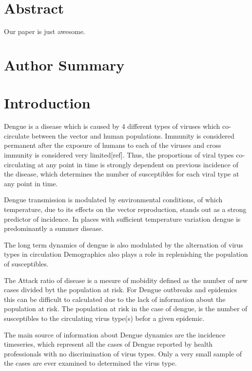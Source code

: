 \section*{Abstract}
Our paper is just awesome.
\section*{Author Summary}

\section*{Introduction}

Dengue is a disease which is caused by 4 different types of viruses 
which co-circulate between the vector and human populations. Immunity is 
considered permanent after the exposure of humans to each of the viruses and 
cross immunity is considered very limited[ref].
Thus, the proportions of viral types co-circulating at any point in time is 
strongly dependent on previous incidence of the disease, which determines the 
number of susceptibles for each viral type at any point in time.

Dengue transmission is modulated by environmental conditions, of which 
temperature, due to its effects on the 
vector reproduction, stands out as a strong predictor of 
incidence\cite{honorio_temporal_2009,wu_higher_2009}.
In places with sufficient temperature variation dengue is predominantly a 
summer disease.

The long term dynamics of dengue is also modulated by the alternation of virus 
types in circulation Demographics also plays a role in replenishing the 
population of susceptibles. 

The Attack ratio of disease is a mesure of mobidity defined as the number of new
cases divided byt the population at risk. For Dengue outbreaks and epidemics 
this can be difficult to calculated due to the lack of information about the 
population at risk. The population at risk in the case of dengue, is the number 
of susceptibles to the circulating virus type(s) befor a given epidemic.

The main source of information about Dengue dynamics are the incidence 
timeseries, which represent all the cases of Dengue reported by health 
professionals with no discrimination of virus types. Only a very small sample 
of the cases are ever examined to determined the virus type.

